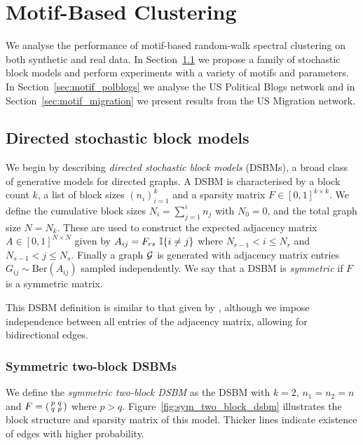 \chapter{Motif-Based Clustering} \label{chap:motif}

We analyse the performance of motif-based random-walk spectral clustering on both synthetic and real data.
In Section~\ref{sec:motif_dsbms} we propose a family of stochastic block models and perform experiments with a variety of motifs and parameters.
In Section~\ref{sec:motif_polblogs} we analyse the US Political Blogs network and in Section~\ref{sec:motif_migration} we present results from the US Migration network.






\section{Directed stochastic block models} \label{sec:motif_dsbms}

We begin by describing \emph{directed stochastic block models} (DSBMs), a broad class of generative models for directed graphs. A DSBM is characterised by a block count $k$, a list of block sizes $(n_i)_{i=1}^k$ and a sparsity matrix $F \in [0,1]^{k \times k}$. We define the cumulative block sizes $N_i = \sum_{j=1}^i n_j$ with $N_0=0$, and the total graph size $N=N_k$. These are used to construct the expected adjacency matrix $A \in [0,1]^{N \times N}$ given by $A_{ij} = F_{rs} \ \mathbb{I}\{i \neq j\}$ where $N_{r-1} < i \leq N_r$ and $N_{s-1} < j \leq N_s$. Finally a graph $\mathcal{G}$ is generated with adjacency matrix entries $G_{ij} \sim \textrm{Ber}(A_{ij})$ sampled independently. We say that a DSBM is \emph{symmetric} if $F$ is a symmetric matrix.

This DSBM definition is similar to that given by \cite{DirectedClustImbCuts}, although we impose independence between all entries of the adjacency matrix, allowing for bidirectional edges.


\subsection{Symmetric two-block DSBMs}


We define the \emph{symmetric two-block DSBM} as the DSBM with $k=2$, $n_1=n_2=n$ and $F = \begin{psmallmatrix} p & q \\ q & p \end{psmallmatrix}$ where $p > q$. Figure~\ref{fig:sym_two_block_dsbm} illustrates the block structure and sparsity matrix of this model. Thicker lines indicate existence of edges with higher probability.


